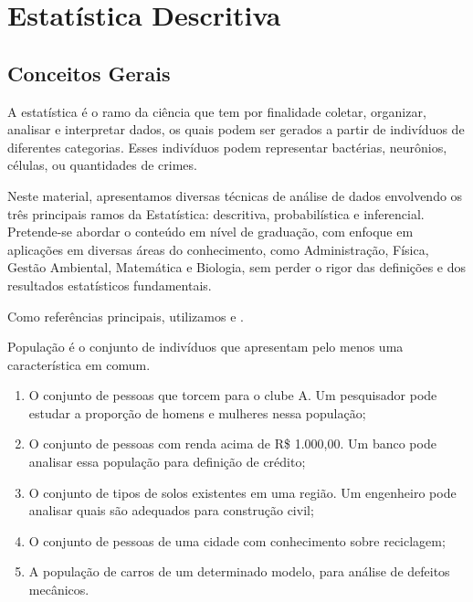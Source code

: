 
\chapter{Estatística Descritiva}

\section{Conceitos Gerais}

\inic A estatística é o ramo da ciência que tem por finalidade coletar, organizar, analisar e interpretar dados, os quais podem ser gerados a partir de indivíduos de diferentes categorias. Esses indivíduos podem representar bactérias, neurônios, células, ou quantidades de crimes.

Neste material, apresentamos diversas técnicas de análise de dados envolvendo os três principais ramos da Estatística: descritiva, probabilística e inferencial. Pretende-se abordar o conteúdo em nível de graduação, com enfoque em aplicações em diversas áreas do conhecimento, como Administração, Física, Gestão Ambiental, Matemática e Biologia, sem perder o rigor das definições e dos resultados estatísticos fundamentais.

Como referências principais, utilizamos \cite{morettin2017estatistica} e \cite{da1981curso}.

\begin{defin}[População]
População é o conjunto de indivíduos que apresentam pelo menos uma característica em comum.
\end{defin}

\noindent \exemplo
\begin{enumerate}
    \item[(i)] O conjunto de pessoas que torcem para o clube A. Um pesquisador pode estudar a proporção de homens e mulheres nessa população;
    
    \item[(ii)] O conjunto de pessoas com renda acima de R\$ 1.000,00. Um banco pode analisar essa população para definição de crédito;
    
    \item[(iii)] O conjunto de tipos de solos existentes em uma região. Um engenheiro pode analisar quais são adequados para construção civil;
    
    \item[(iv)] O conjunto de pessoas de uma cidade com conhecimento sobre reciclagem;
    
    \item[(v)] A população de carros de um determinado modelo, para análise de defeitos mecânicos.
\end{enumerate}

